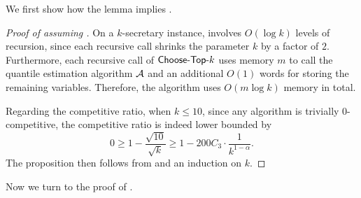 We first show how the lemma implies .

\begin{proof}[Proof of  assuming ]
    On a $k$-secretary instance,  involves $O(\log k)$ levels of recursion, since each recursive call shrinks the parameter $k$ by a factor of $2$. Furthermore, each recursive call of $\textsf{Choose-Top-}k$ uses memory $m$ to call the quantile estimation algorithm $\mathcal{A}$ and an additional $O(1)$ words for storing the remaining variables. Therefore, the algorithm uses $O(m\log k)$ memory in total.
    
    Regarding the competitive ratio, when $k \le 10$, since any algorithm is trivially $0$-competitive, the competitive ratio is indeed lower bounded by
    \[
        0
    \ge 1 - \frac{\sqrt{10}}{\sqrt{k}}
    \ge 1 -200C_3\cdot \frac{1}{k^{1 - \alpha}}.
    \]
    The proposition then follows from  and an induction on $k$.
\end{proof}

Now we turn to the proof of .

